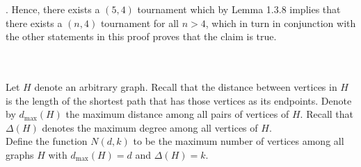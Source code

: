 \documentclass{article}
\begin{document}
{{\begin{center}
\end{center}.
	Hence, there exists a $(5,4)$ tournament which by Lemma 1.3.8 implies that there exists a $(n,4)$ tournament for all $n > 4$, which in turn in conjunction with the other statements in this proof proves that the claim is true.
	}
}
\noindent \underline{\hspace{5in}}\\[2em]
\noindent \maltese \hspace{1ex}{\bf Sub-Experience Two: An Optimization Problem}\\[1em]
\noindent Let $H$ denote an arbitrary graph.  Recall that the distance between vertices in $H$ is the length of the shortest path that has those vertices as its endpoints.  Denote by $d_{\mathrm{max}}(H)$ the maximum distance among all pairs of vertices of $H$.  Recall that $\Delta(H)$ denotes the maximum degree among all vertices of $H$.\\
\noindent Define the function $N(d,k)$ to be the maximum number of vertices among all graphs $H$ with $d_{\mathrm{max}}(H) = d$ and $\Delta(H) = k$.\\
\end{document}
